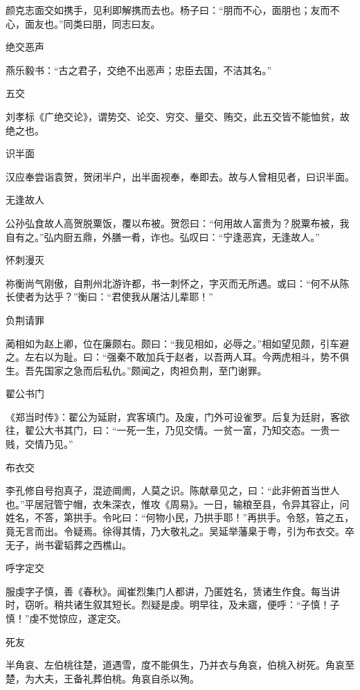 \documentclass[a4paper,12pt,UTF8,twoside]{ctexbook}
\begin{document}
    颜克志面交如携手，见利即解携而去也。杨子曰：“朋而不心，面朋也；友而不心，面友也。”同类曰朋，同志曰友。
    
    绝交恶声
    
    燕乐毅书：“古之君子，交绝不出恶声；忠臣去国，不洁其名。”
    
    五交
    
    刘孝标《广绝交论》，谓势交、论交、穷交、量交、贿交，此五交皆不能恤贫，故绝之也。
    
    识半面
    
    汉应奉尝诣袁贺，贺闭半户，出半面视奉，奉即去。故与人曾相见者，曰识半面。
    
    无逢故人
    
    公孙弘食故人高贺脱粟饭，覆以布被。贺怨曰：“何用故人富贵为？脱粟布被，我自有之。”弘内厨五鼎，外膳一肴，诈也。弘叹曰：“宁逢恶宾，无逢故人。”
    
    怀刺漫灭
    
    祢衡尚气刚傲，自荆州北游许都，书一刺怀之，字灭而无所遇。或曰：“何不从陈长使者为达乎？”衡曰：“君使我从屠沽儿辈耶！”
    
    负荆请罪
    
    蔺相如为赵上卿，位在廉颇右。颇曰：“我见相如，必辱之。”相如望见颇，引车避之。左右以为耻。曰：“强秦不敢加兵于赵者，以吾两人耳。今两虎相斗，势不俱生。吾先国家之急而后私仇。”颇闻之，肉袒负荆，至门谢罪。
    
    翟公书门
    
    《郑当时传》：翟公为延尉，宾客填门。及废，门外可设雀罗。后复为廷尉，客欲往，翟公大书其门，曰：“一死一生，乃见交情。一贫一富，乃知交态。一贵一贱，交情乃见。”
    
    布衣交
    
    李孔修自号抱真子，混迹阛阓，人莫之识。陈献章见之，曰：“此非俯首当世人也。”平居冠管宁帽，衣朱深衣，惟攻《周易》。一日，输粮至县，令异其容止，问姓名，不答，第拱手。令叱曰：“何物小民，乃拱手耶！”再拱手。令怒，笞之五，竟无言而出。令疑焉。徐得其情，乃大敬礼之。吴延举藩臬于粤，引为布衣交。卒无子，尚书霍韬葬之西樵山。
    
    呼字定交
    
    服虔字子慎，善《春秋》。闻崔烈集门人都讲，乃匿姓名，赁诸生作食。每当讲时，窃听。稍共诸生叙其短长。烈疑是虔。明早往，及未寤，便呼：“子慎！子慎！”虔不觉惊应，遂定交。
    
    死友
    
    半角哀、左伯桃往楚，道遇雪，度不能俱生，乃并衣与角哀，伯桃入树死。角哀至楚，为大夫，王备礼葬伯桃。角哀自杀以殉。
    
\end{document}
